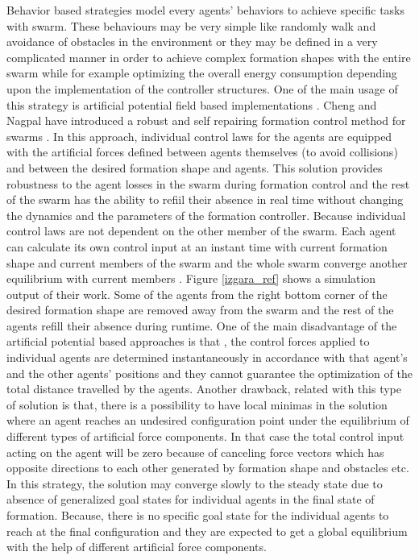 Behavior based strategies model every agents' behaviors to achieve specific tasks with swarm. These behaviours may be very simple like randomly walk and avoidance of  obstacles in the environment or they may be defined in a very complicated manner in order to achieve complex formation shapes with the entire swarm while for example optimizing the overall energy consumption depending  upon the implementation of the controller structures.  One of the main usage of this strategy is artificial potential field based implementations . Cheng and Nagpal have introduced a robust and self repairing formation control method for swarms \cite{24}. In this approach, individual control laws for the agents are equipped with the artificial forces defined between agents themselves (to avoid collisions) and between the desired formation shape and agents. This solution provides robustness to the agent losses in the swarm during formation control and the rest of the swarm has the ability to refiil their absence in real time without changing the dynamics and the parameters of the formation controller. Because individual control laws are not dependent on the other member of the swarm. Each agent can calculate its own control input at an instant time with current formation shape and current members of the swarm and the whole swarm converge another equilibrium with current members \cite{24}. Figure \ref{izgara_ref} shows a simulation output of their work. Some of the agents from the right bottom corner of the desired formation shape are removed away from the swarm and the rest of the agents refill their absence during runtime. One of the main disadvantage of the artificial potential based approaches is that , the control forces applied to individual agents are determined instantaneously in accordance with that agent's and the other agents' positions and they cannot guarantee the optimization of the total distance travelled by the agents. Another drawback, related with this type of solution is that, there is a possibility to have local minimas in the solution where an agent reaches an undesired configuration point under the equilibrium of different types of artificial force components. In that case the total control input acting on the agent will be zero because of canceling force vectors which has opposite directions to each other generated by formation shape and obstacles etc. In this strategy, the solution may converge slowly to the steady state due to absence of generalized goal states for individual agents in the final state of formation. Because, there is no specific goal state for the individual agents to reach at the final configuration and they are expected to get a global equilibrium with the help of different artificial force components. 

